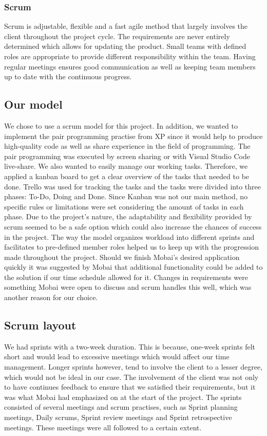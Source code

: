 \subsubsection*{Scrum}
Scrum is adjustable, flexible and a fast agile method that largely involves the client throughout the project cycle\cite{ScrumDefinition}. The requirements are never entirely determined which allows for updating the product. Small teams with defined roles are appropriate to provide different responsibility within the team. Having regular meetings ensures good communication as well as keeping team members up to date with the continuous progress.    

\subsection{Our model}
We chose to use a scrum model for this project. In addition, we wanted to implement the pair programming practise from XP since it would help to produce high-quality code as well as share experience in the field of programming. The pair programming was executed by screen sharing or with Visual Studio Code live-share. We also wanted to easily manage our working tasks. Therefore, we applied a kanban board to get a clear overview of the tasks that needed to be done. Trello \cite{Trello} was used for tracking the tasks and the tasks were divided into three phases: To-Do, Doing and Done. Since Kanban was not our main method, no specific rules or limitations were set considering the amount of tasks in each phase. Due to the project's nature, the adaptability and flexibility provided by scrum seemed to be a safe option which could also increase the chances of success in the project. The way the model organizes workload into different sprints and facilitates to pre-defined member roles helped us to keep up with the progression made throughout the project. Should we finish Mobai's desired application quickly it was suggested by Mobai that additional functionality could be added to the solution if our time schedule allowed for it. Changes in requirements were something Mobai were open to discuss and scrum handles this well, which was another reason for our choice. 

\subsection{Scrum layout}
We had sprints with a two-week duration. This is because, one-week sprints felt short and would lead to excessive meetings which would affect our time management. Longer sprints however, tend to involve the client to a lesser degree, which would not be ideal in our case. The involvement of the client was not only to have continues feedback to ensure that we satisfied their requirements, but it was what Mobai had emphasized on at the start of the project. The sprints consisted of several meetings and scrum practises, such as Sprint planning meetings, Daily scrums, Sprint review meetings and Sprint retrospective meetings. These meetings were all followed to a certain extent. 

